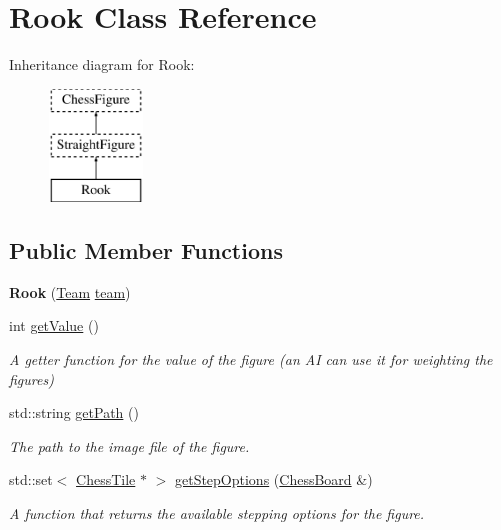 \hypertarget{classRook}{}\section{Rook Class Reference}
\label{classRook}
Inheritance diagram for Rook\+:\begin{figure}[H]
\begin{center}
\leavevmode
\includegraphics[height=3.000000cm]{classRook}
\end{center}
\end{figure}
\subsection*{Public Member Functions}
\begin{DoxyCompactItemize}
\item 
\mbox{\label{classRook_abdf50f6076fa9c5fed408815b91a6e82}} 
{\bfseries Rook} (\mbox{\hyperlink{classChessFigure_a62f54318c1f28a08e6a6a2707f697a1d}{Team}} \mbox{\hyperlink{classChessFigure_ac7d0751a28c94d49927b9524390d1261}{team}})
\item 
\mbox{\label{classRook_ab3487b23185bb20b2b5306f9a5fe127b}} 
int \mbox{\hyperlink{classRook_ab3487b23185bb20b2b5306f9a5fe127b}{get\+Value}} ()
\begin{DoxyCompactList}\small\item\em A getter function for the value of the figure (an AI can use it for weighting the figures) \end{DoxyCompactList}\item 
\mbox{\label{classRook_a0cae7fbabe3169ec506fcd29ae396ba7}} 
std\+::string \mbox{\hyperlink{classRook_a0cae7fbabe3169ec506fcd29ae396ba7}{get\+Path}} ()
\begin{DoxyCompactList}\small\item\em The path to the image file of the figure. \end{DoxyCompactList}\item 
std\+::set$<$ \mbox{\hyperlink{classChessTile}{Chess\+Tile}} $\ast$ $>$ \mbox{\hyperlink{classRook_a466f48269ca58857c2a1ab1ab92c91f8}{get\+Step\+Options}} (\mbox{\hyperlink{classChessBoard}{Chess\+Board}} \&)
\begin{DoxyCompactList}\small\item\em A function that returns the available stepping options for the figure. \end{DoxyCompactList}\end{DoxyCompactItemize}
